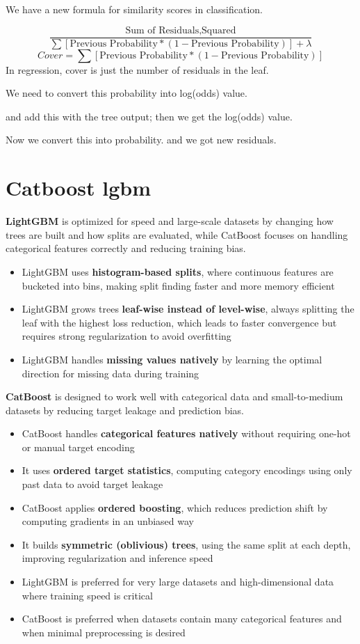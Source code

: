 \documentclass[10pt,a4paper]{article}
\begin{document}
		We have a new formula for similarity scores in classification.
	
		$$	\frac{\text{Sum of Residuals,Squared}}{\sum \left[ \text{Previous Probability}*(1-\text{Previous Probability})\right]+ \lambda}
		$$
		$$	Cover = {\sum \left[ \text{Previous Probability}*(1-\text{Previous Probability})\right]}
		$$
		In regression, cover is just the number of residuals in the leaf.
	
		We need to convert this probability into log(odds) value.
	
		and add this with the tree output; then we get the log(odds) value.
	
		Now we convert this into probability. and we got new residuals.
	
		\section{Catboost lgbm}
	
		\textbf{LightGBM} is optimized for speed and large-scale datasets by changing how trees are built and how splits are evaluated, while CatBoost focuses on handling categorical features correctly and reducing training bias.
	
		\begin{itemize}
			\item LightGBM uses \textbf{histogram-based splits}, where continuous features are bucketed into bins, making split finding faster and more memory efficient
			\item LightGBM grows trees \textbf{leaf-wise instead of level-wise}, always splitting the leaf with the highest loss reduction, which leads to faster convergence but requires strong regularization to avoid overfitting
			\item LightGBM handles \textbf{missing values natively} by learning the optimal direction for missing data during training
		\end{itemize}
	
		\textbf{CatBoost} is designed to work well with categorical data and small-to-medium datasets by reducing target leakage and prediction bias.
	
		\begin{itemize}
			\item CatBoost handles \textbf{categorical features natively} without requiring one-hot or manual target encoding
			\item It uses \textbf{ordered target statistics}, computing category encodings using only past data to avoid target leakage
			\item CatBoost applies \textbf{ordered boosting}, which reduces prediction shift by computing gradients in an unbiased way
			\item It builds \textbf{symmetric (oblivious) trees}, using the same split at each depth, improving regularization and inference speed
			\item LightGBM is preferred for very large datasets and high-dimensional data where training speed is critical
			\item CatBoost is preferred when datasets contain many categorical features and when minimal preprocessing is desired
		\end{itemize}
	
\end{document}
